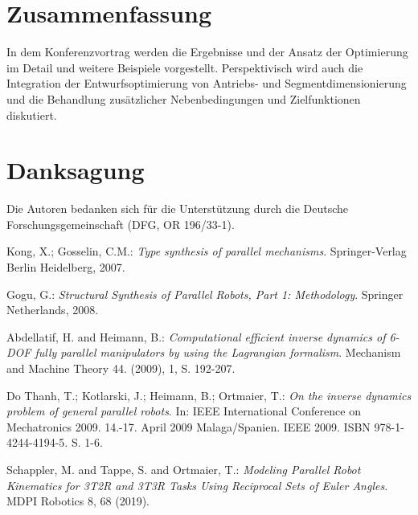 \documentclass[fleqn,a4paper,10pt]{article}
\begin{document}
\begin{multicols}{2}
\section{Zusammenfassung}

In dem Konferenzvortrag werden die Ergebnisse und der Ansatz der Optimierung im Detail und weitere Beispiele vorgestellt.
Perspektivisch wird auch die Integration der Entwurfsoptimierung von Antriebs- und Segmentdimensionierung und die Behandlung zusätzlicher Nebenbedingungen und Zielfunktionen diskutiert.


\section{Danksagung}

Die Autoren bedanken sich für die Unterstützung durch die Deutsche Forschungsgemeinschaft (DFG, OR 196/33-1).

\begin{thebibliography}{99}

Kong, X.; Gosselin, C.M.:
\newblock \textit{Type synthesis of parallel mechanisms}.
\newblock Springer-Verlag Berlin Heidelberg, 2007.

Gogu, G.:
\newblock \textit{Structural Synthesis of Parallel Robots, Part 1: Methodology}.
\newblock Springer Netherlands, 2008.

Abdellatif, H. and Heimann, B.:
\newblock \textit{Computational efficient inverse dynamics of 6-DOF fully parallel manipulators by using the Lagrangian formalism}.
\newblock Mechanism and Machine Theory 44. (2009), 1, S. 192-207.


Do Thanh, T.; Kotlarski, J.; Heimann, B.; Ortmaier, T.:
\newblock \textit{On the inverse dynamics problem of general parallel robots}.
\newblock In: IEEE International Conference on Mechatronics 2009. 14.-17. April 2009 Malaga/Spanien. IEEE 2009. ISBN 978-1-4244-4194-5. S. 1-6. 

Schappler, M. and Tappe, S. and Ortmaier, T.:
\newblock \textit{Modeling Parallel Robot Kinematics for 3T2R and 3T3R Tasks Using Reciprocal Sets of Euler Angles}.
\newblock MDPI Robotics 8, 68 (2019).

\end{thebibliography}


\clearpage  %


\end{multicols}
\end{document}

